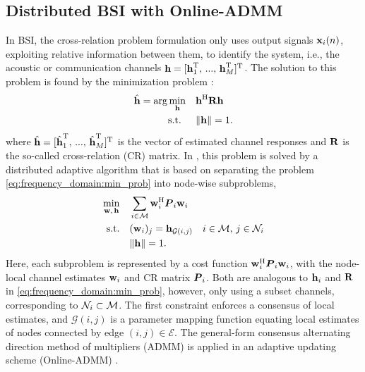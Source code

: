 \documentclass{article}
\begin{document}
\subsection[]{Distributed BSI with Online-ADMM}
In BSI, the cross-relation problem formulation only uses output signals \(\bm{\mathrm{x}}_i(n)\), exploiting relative information between them, to identify the system, i.e., the acoustic or communication channels \(\bm{\mathrm{h}} = [\bm{\mathrm{h}}_1^{\mathrm{T}},\,...,\,\bm{\mathrm{h}}_M^{\mathrm{T}}]^{\mathrm{T}}\).
The solution to this problem is found by the minimization problem \cite{langtongBlindIdentificationEqualization1994,huangAdaptiveMultichannelLeast2002,huangClassFrequencydomainAdaptive2003,blochbergerDBSI}:
\begin{equation}
    \begin{aligned}
        \hat{\bm{\mathrm{h}}} = \arg \min_{\bm{\mathrm{h}}} \quad &\bm{\mathrm{h}}^{\mathrm{H}} \bm{\mathrm{R}} \bm{\mathrm{h}} \\
        \text{s.t. } \quad &\|\bm{\mathrm{h}}\| = 1.
    \end{aligned}\label{eq:frequency_domain:min_prob}
\end{equation}
where \(\hat{\bm{\mathrm{h}}} = [\hat{\bm{\mathrm{h}}}_1^{\mathrm{T}},\,...,\,\hat{\bm{\mathrm{h}}}_M^{\mathrm{T}}]^{\mathrm{T}}\) is the vector of estimated channel responses and \(\bm{\mathrm{R}}\) is the so-called cross-relation (CR) matrix.
In \cite{blochbergerDBSI}, this problem is solved by a distributed adaptive algorithm that is based on separating the problem \eqref{eq:frequency_domain:min_prob} into node-wise subproblems,
\begin{equation}
    \begin{aligned}
        \underset{\bm{\mathrm{w}},\,\bm{\mathrm{h}}}{\min} \quad &\sum_{i \in \mathcal{M}} \bm{\mathrm{w}}_i^{\mathrm{H}} {\bm{{P}}}_i \bm{\mathrm{w}}_i\\
        \text{s.t.} \quad &(\bm{\mathrm{w}}_i)_j = \bm{\mathrm{h}}_{\mathcal{G}(i,j)}\quad i \in \mathcal{M},\,j \in \mathcal{N}_i\\
        &\|\bm{\mathrm{h}}\| = 1.
    \end{aligned}\label{eq:general_consensus_admm:min_prob}
\end{equation}
Here, each subproblem is represented by a cost function \(\bm{\mathrm{w}}_i^{\mathrm{H}} {\bm{{P}}}_i \bm{\mathrm{w}}_i\), with the node-local channel estimates \(\bm{\mathrm{w}}_i\) and CR matrix \({\bm{{P}}}_i\).
Both are analogous to \(\bm{\mathrm{h}}_i\) and \(\bm{\mathrm{R}}\) in \eqref{eq:frequency_domain:min_prob}, however, only using a subset channels, corresponding to \(\mathcal{N}_i \subset \mathcal{M}\).
The first constraint enforces a consensus of local estimates, and \(\mathcal{G}(i,j)\) is a parameter mapping function equating local estimates of nodes connected by edge \((i,j) \in \mathcal{E}\).
The general-form consensus alternating direction method of multipliers (ADMM) \cite{boydDistributedOptimizationStatistical2011} is applied in an adaptive updating scheme (Online-ADMM) \cite{wangOnlineAlternatingDirection2013,hosseiniOnlineDistributedADMM2014}.
\end{document}
